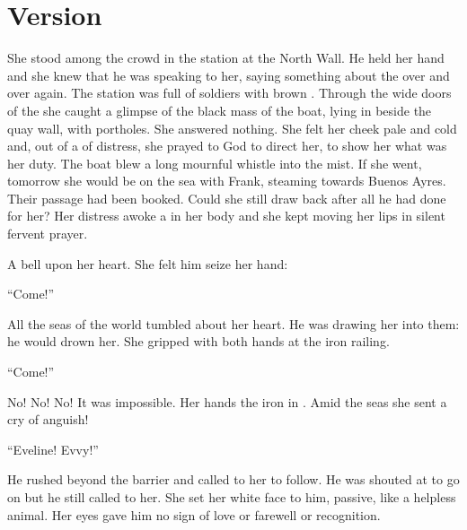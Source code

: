 \documentclass{fiche}
\begin{document}
\newpage
\section{Version}

\begin{version}
She stood among the  crowd in the station at the North
Wall. He held her hand and she knew that he was speaking to her, saying something about the
 over and over again. The station was full of soldiers
with brown  . Through the wide doors of the
 she caught a glimpse of the black mass of the boat, lying in
beside the quay wall, with  portholes. She answered nothing.
She felt her cheek pale and cold and, out of a  of distress,
she prayed to God to direct her, to show her what was her duty. The boat blew a long mournful
whistle into the mist. If she went, tomorrow she would be on the sea with Frank, steaming
towards Buenos Ayres. Their passage had been booked. Could she still draw back after all he
had done for her? Her distress awoke a  in her body and she
kept moving her lips in silent fervent prayer.

A bell  upon her heart. She felt him seize her hand:

``Come!''

All the seas of the world tumbled about her heart. He was drawing her into them: he would
drown her. She gripped with both hands at the iron railing.

``Come!''

No! No! No! It was impossible. Her hands  the iron in
. Amid the seas she sent a cry of anguish!

``Eveline! Evvy!''

He rushed beyond the barrier and called to her to follow. He was shouted at to go on but he
still called to her. She set her white face to him, passive, like a helpless animal. Her eyes
gave him no sign of love or farewell or recognition.
\end{version}

\end{document}

